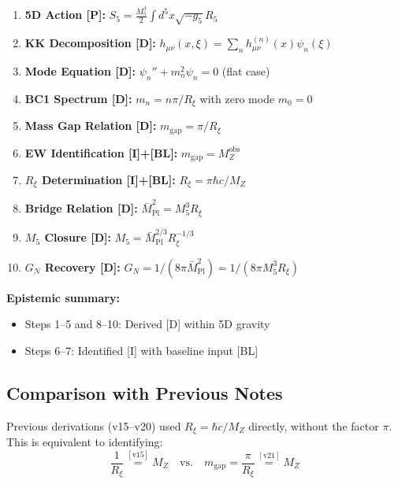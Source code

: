 \documentclass[11pt,a4paper]{article}
\newcommand{\Rxi}{R_\xi}
\newcommand{\Mplbar}{\bar{M}_{\mathrm{Pl}}}
\newcommand{\Mfive}{M_5}
\newcommand{\GN}{G_N}
\newcommand{\MZ}{M_Z}
\newcommand{\mgap}{m_{\mathrm{gap}}}
\begin{document}
\begin{enumerate}
\item \textbf{5D Action [P]:} $S_5 = \frac{\Mfive^3}{2}\int d^5x \sqrt{-g_5} R_5$

\item \textbf{KK Decomposition [D]:} $h_{\mu\nu}(x,\xi) = \sum_n h_{\mu\nu}^{(n)}(x)\psi_n(\xi)$

\item \textbf{Mode Equation [D]:} $\psi_n'' + m_n^2 \psi_n = 0$ (flat case)

\item \textbf{BC1 Spectrum [D]:} $m_n = n\pi/\Rxi$ with zero mode $m_0 = 0$

\item \textbf{Mass Gap Relation [D]:} $\mgap = \pi/\Rxi$

\item \textbf{EW Identification [I]+[BL]:} $\mgap = \MZ^{\mathrm{obs}}$

\item \textbf{$\Rxi$ Determination [I]+[BL]:} $\Rxi = \pi\hbar c/\MZ$

\item \textbf{Bridge Relation [D]:} $\Mplbar^2 = \Mfive^3 \Rxi$

\item \textbf{$\Mfive$ Closure [D]:} $\Mfive = \Mplbar^{2/3}\Rxi^{-1/3}$

\item \textbf{$\GN$ Recovery [D]:} $\GN = 1/(8\pi\Mplbar^2) = 1/(8\pi\Mfive^3\Rxi)$
\end{enumerate}

\textbf{Epistemic summary:}
\begin{itemize}
\item Steps 1--5 and 8--10: Derived [D] within 5D gravity
\item Steps 6--7: Identified [I] with baseline input [BL]
\end{itemize}

\subsection{Comparison with Previous Notes}

Previous derivations (v15--v20) used $\Rxi = \hbar c/\MZ$ directly, without the
factor $\pi$. This is equivalent to identifying:
\begin{equation}
\frac{1}{\Rxi} \stackrel{[\text{v15}]}{=} \MZ \quad \text{vs.} \quad
\mgap = \frac{\pi}{\Rxi} \stackrel{[\text{v21}]}{=} \MZ
\label{eq:convention-comparison}
\end{equation}
\end{document}
